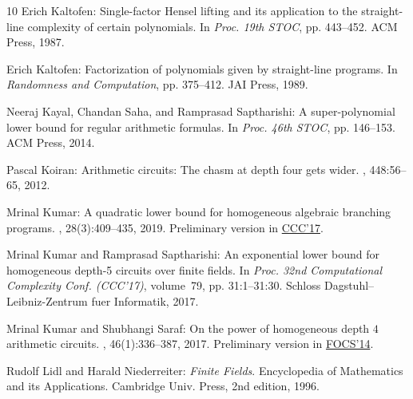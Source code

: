 \documentclass[11pt]{article}
\numberwithin{equation}{section}
\theoremstyle{definition}
\theoremstyle{plain}
\begin{document}
\begin{thebibliography}{10}
{\sc Erich Kaltofen}: Single-factor {H}ensel lifting and its application to the
  straight-line complexity of certain polynomials.
\newblock In {\em Proc. 19th STOC}, pp. 443--452. ACM Press, 1987.
\newblock [\epfmtdoi{10.1145/28395.28443}]

{\sc Erich Kaltofen}: Factorization of polynomials given by straight-line
  programs.
\newblock In {\em Randomness and Computation}, pp. 375--412. JAI Press, 1989.

{\sc Neeraj Kayal, Chandan Saha, and Ramprasad Saptharishi}: A super-polynomial
  lower bound for regular arithmetic formulas.
\newblock In {\em Proc. 46th STOC}, pp. 146--153. ACM Press, 2014.
\newblock [\epfmtdoi{10.1145/2591796.2591847}]

{\sc Pascal Koiran}: Arithmetic circuits: {T}he chasm at depth four gets wider.
, 448:56--65, 2012.

{\sc Mrinal Kumar}: A quadratic lower bound for homogeneous algebraic branching
  programs.
, 28(3):409--435, 2019.
\newblock Preliminary version in
  \href{http://drops.dagstuhl.de/opus/frontdoor.php?source_opus=7513}{CCC'17}.
\newblock [\epfmtdoi{10.1007/s00037-019-00186-3}]

{\sc Mrinal Kumar and Ramprasad Saptharishi}: An exponential lower bound for
  homogeneous depth-5 circuits over finite fields.
\newblock In {\em Proc. 32nd Computational Complexity Conf. (CCC'17)},
  volume~79, pp. 31:1--31:30. Schloss Dagstuhl--Leibniz-Zentrum fuer
  Informatik, 2017.

{\sc Mrinal Kumar and Shubhangi Saraf}: On the power of homogeneous depth $4$
  arithmetic circuits.
, 46(1):336--387, 2017.
\newblock Preliminary version in
  \href{https://ieeexplore.ieee.org/document/6979021}{FOCS'14}.

{\sc Rudolf Lidl and Harald Niederreiter}: {\em Finite Fields}.
\newblock Encyclopedia of Mathematics and its Applications. Cambridge Univ.
  Press, 2nd edition, 1996.


\end{thebibliography}
\end{document}
